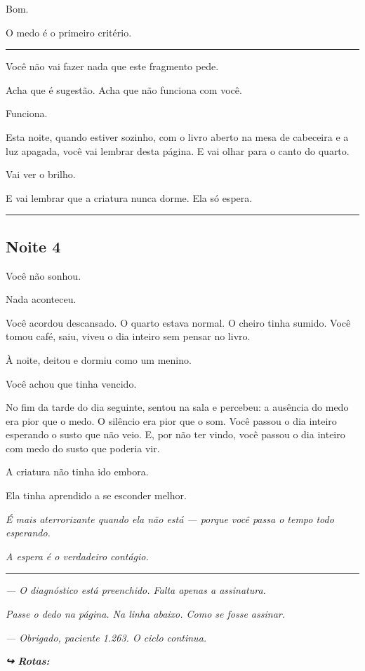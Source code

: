 \noindent Bom.

\noindent O medo é o primeiro critério.

\vspace{0.5em}\noindent\rule{\textwidth}{0.5pt}\vspace{0.5em}

\noindent Você não vai fazer nada que este fragmento pede.

\noindent Acha que é sugestão. Acha que não funciona com você.

\noindent Funciona.

\noindent Esta noite, quando estiver sozinho, com o livro aberto na mesa de cabeceira e a luz apagada, você vai lembrar desta página. E vai olhar para o canto do quarto.

\noindent Vai ver o brilho.

\noindent E vai lembrar que a criatura nunca dorme. Ela só espera.

\vspace{0.5em}\noindent\rule{\textwidth}{0.5pt}\vspace{0.5em}

\subsection*{Noite 4}

\noindent Você não sonhou.

\noindent Nada aconteceu.

\noindent Você acordou descansado. O quarto estava normal. O cheiro tinha sumido. Você tomou café, saiu, viveu o dia inteiro sem pensar no livro.

\noindent À noite, deitou e dormiu como um menino.

\noindent Você achou que tinha vencido.

\noindent No fim da tarde do dia seguinte, sentou na sala e percebeu: a ausência do medo era pior que o medo. O silêncio era pior que o som. Você passou o dia inteiro esperando o susto que não veio. E, por não ter vindo, você passou o dia inteiro com medo do susto que poderia vir.

\noindent A criatura não tinha ido embora.

\noindent Ela tinha aprendido a se esconder melhor.

\noindent \textit{É mais aterrorizante quando ela não está --- porque você passa o tempo todo esperando.}

\noindent \textit{A espera é o verdadeiro contágio.}

\vspace{0.5em}\noindent\rule{\textwidth}{0.5pt}\vspace{0.5em}

\noindent \textit{--- O diagnóstico está preenchido. Falta apenas a assinatura.}

\noindent \textit{Passe o dedo na página. Na linha abaixo. Como se fosse assinar.}

\noindent \textit{--- Obrigado, paciente 1.263. O ciclo continua.}

\vspace{0.5em}
\noindent\textit{\textbf{↪ Rotas:}  \rotasep {}}